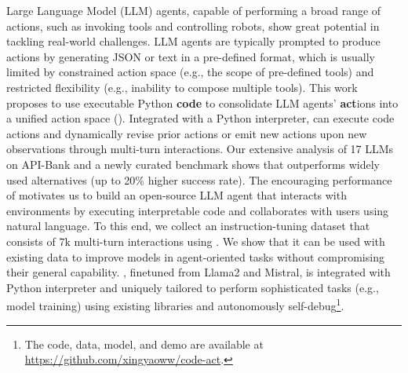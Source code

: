 Large Language Model (LLM) agents, capable of performing a broad range of actions, such as invoking tools and controlling robots, show great potential in tackling real-world challenges.
LLM agents are typically prompted to produce actions by generating JSON or text in a pre-defined format, which is usually limited by constrained action space (e.g., the scope of pre-defined tools) and restricted flexibility (e.g., inability to compose multiple tools).
This work proposes to use executable Python \textbf{code} to consolidate LLM agents' \textbf{act}ions into a unified action space (\approach).
Integrated with a Python interpreter, \approach can execute code actions and dynamically revise prior actions or emit new actions upon new observations through multi-turn interactions.
Our extensive analysis of 17 LLMs on API-Bank and a newly curated benchmark shows that \approach outperforms widely used alternatives (up to 20\% higher success rate).
The encouraging performance of \approach motivates us to build an open-source LLM agent that interacts with environments by executing interpretable code and collaborates with users using natural language.
To this end, we collect an instruction-tuning dataset \dataname that consists of 7k multi-turn interactions using \approach.
We show that it can be used with existing data to improve models in agent-oriented tasks without compromising their general capability.
\modelname, finetuned from Llama2 and Mistral, is integrated with Python interpreter and uniquely tailored to perform sophisticated tasks (e.g., model training) using existing libraries and autonomously self-debug\footnote{The code, data, model, and demo are available at \url{https://github.com/xingyaoww/code-act}.}.
\vspace{-0.2cm}